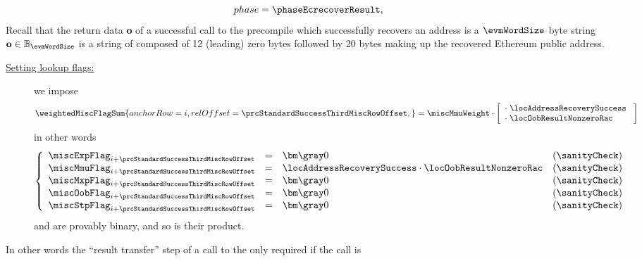\begin{description}
\begin{description}
\[{						phase     = \phaseEcrecoverResult                 ,
						}
				\]
				\saNote{} Recall that the return data \textbf{o} of a successful call to the \instEcrecover{} precompile which successfully recovers an address is a $\evmWordSize$ byte string $\textbf{o} \in \mathbb{B}_{\evmWordSize}$ is a string of composed of 12 (leading) zero bytes followed by 20 bytes making up the recovered Ethereum public address.
		\end{description}
	\item[\underline{Miscellaneous-row $n^°(i + \prcStandardSuccessThirdMiscRowOffset)$:}]
		\begin{description}
			\item[\underline{Setting lookup flags:}]
				we impose
				\[
					\weightedMiscFlagSum {
						anchorRow = i                                     ,
						relOffset = \prcStandardSuccessThirdMiscRowOffset ,
					}
					=
					\miscMmuWeight
					\cdot
					\left[ \begin{array}{l}
						\cdot \; \locAddressRecoverySuccess   \\
						\cdot \; \locOobResultNonzeroRac      \\
					\end{array} \right]
				\]
				in other words
				\[
					\left\{ \begin{array}{lclc}
						\miscExpFlag _{i + \prcStandardSuccessThirdMiscRowOffset} & = & \gZero                                                   & (\sanityCheck) \\
						\miscMmuFlag _{i + \prcStandardSuccessThirdMiscRowOffset} & = & \locAddressRecoverySuccess \cdot \locOobResultNonzeroRac & (\sanityCheck) \\
						\miscMxpFlag _{i + \prcStandardSuccessThirdMiscRowOffset} & = & \gZero                                                   & (\sanityCheck) \\
						\miscOobFlag _{i + \prcStandardSuccessThirdMiscRowOffset} & = & \gZero                                                   & (\sanityCheck) \\
						\miscStpFlag _{i + \prcStandardSuccessThirdMiscRowOffset} & = & \gZero                                                   & (\sanityCheck) \\
					\end{array} \right.
				\]
				\saNote{}
				\locAddressRecoverySuccess{} and \locOobResultNonzeroRac{} are provably binary, and so is their product.
		\end{description}
		\saNote{} In other words the ``result transfer'' step of a call to the \instEcrecover{} only required if the call is

\end{description}

